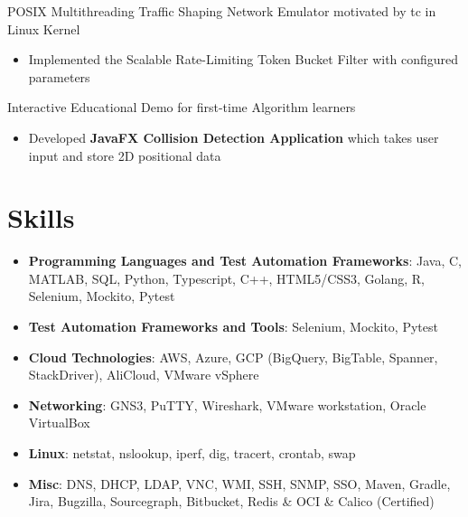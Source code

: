 \documentclass{resume}
\begin{document}

POSIX Multithreading Traffic Shaping Network Emulator motivated by tc in Linux Kernel
\begin{itemize}[parsep=0.10ex]
    \item Implemented the Scalable Rate-Limiting Token Bucket Filter with configured parameters
\end{itemize}


Interactive Educational Demo for first-time Algorithm learners
\begin{itemize}[parsep=0.10ex]
    \item Developed \textbf{JavaFX Collision Detection Application} which takes user input and store 2D positional data
\end{itemize}

\section{Skills}

\begin{itemize}
    \item \textbf{Programming Languages and Test Automation Frameworks}: Java, C, MATLAB, SQL, Python, Typescript, C++, HTML5/CSS3, Golang, R, Selenium, Mockito, Pytest
    \item \textbf{Test Automation Frameworks and Tools}: Selenium, Mockito, Pytest
    \item \textbf{Cloud Technologies}: AWS, Azure, GCP (BigQuery, BigTable, Spanner, StackDriver), AliCloud, VMware vSphere
    \item \textbf{Networking}: GNS3, PuTTY, Wireshark, VMware workstation, Oracle VirtualBox
    \item \textbf{Linux}: netstat, nslookup, iperf, dig, tracert, crontab, swap
    \item \textbf{Misc}: DNS, DHCP, LDAP, VNC, WMI, SSH, SNMP, SSO, Maven, Gradle, Jira, Bugzilla, Sourcegraph, Bitbucket, Redis \& OCI \& Calico (Certified)
\end{itemize}
\end{document}
